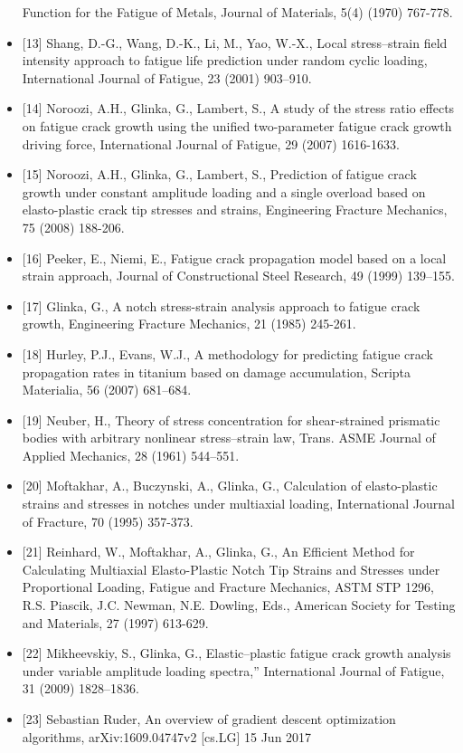 \documentclass[11pt]{article}
\begin{document}
\begin{itemize}
  Function for the Fatigue of Metals, Journal of Materials, 5(4) (1970)
  767-778.
\item
  {[}13{]} Shang, D.-G., Wang, D.-K., Li, M., Yao, W.-X., Local
  stress--strain field intensity approach to fatigue life prediction
  under random cyclic loading, International Journal of Fatigue, 23
  (2001) 903--910.
\item
  {[}14{]} Noroozi, A.H., Glinka, G., Lambert, S., A study of the stress
  ratio effects on fatigue crack growth using the unified two-parameter
  fatigue crack growth driving force, International Journal of Fatigue,
  29 (2007) 1616-1633.
\item
  {[}15{]} Noroozi, A.H., Glinka, G., Lambert, S., Prediction of fatigue
  crack growth under constant amplitude loading and a single overload
  based on elasto-plastic crack tip stresses and strains, Engineering
  Fracture Mechanics, 75 (2008) 188-206.
\item
  {[}16{]} Peeker, E., Niemi, E., Fatigue crack propagation model based
  on a local strain approach, Journal of Constructional Steel Research,
  49 (1999) 139--155.
\item
  {[}17{]} Glinka, G., A notch stress-strain analysis approach to
  fatigue crack growth, Engineering Fracture Mechanics, 21 (1985)
  245-261.
\item
  {[}18{]} Hurley, P.J., Evans, W.J., A methodology for predicting
  fatigue crack propagation rates in titanium based on damage
  accumulation, Scripta Materialia, 56 (2007) 681--684.
\item
  {[}19{]} Neuber, H., Theory of stress concentration for shear-strained
  prismatic bodies with arbitrary nonlinear stress--strain law, Trans.
  ASME Journal of Applied Mechanics, 28 (1961) 544--551.
\item
  {[}20{]} Moftakhar, A., Buczynski, A., Glinka, G., Calculation of
  elasto-plastic strains and stresses in notches under multiaxial
  loading, International Journal of Fracture, 70 (1995) 357-373.
\item
  {[}21{]} Reinhard, W., Moftakhar, A., Glinka, G., An Efficient Method
  for Calculating Multiaxial Elasto-Plastic Notch Tip Strains and
  Stresses under Proportional Loading, Fatigue and Fracture Mechanics,
  ASTM STP 1296, R.S. Piascik, J.C. Newman, N.E. Dowling, Eds., American
  Society for Testing and Materials, 27 (1997) 613-629.
\item
  {[}22{]} Mikheevskiy, S., Glinka, G., Elastic--plastic fatigue crack
  growth analysis under variable amplitude loading spectra,''
  International Journal of Fatigue, 31 (2009) 1828--1836.
\item
  {[}23{]} Sebastian Ruder, An overview of gradient descent optimization
  algorithms, arXiv:1609.04747v2 {[}cs.LG{]} 15 Jun 2017
\end{itemize}


    
    
    
\end{document}
